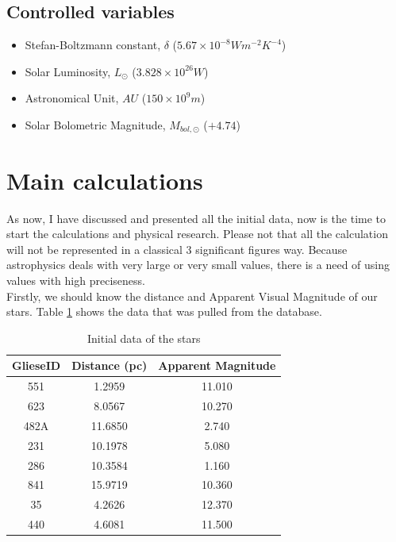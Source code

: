 \documentclass{article}
\begin{document}
  \subsection{Controlled variables}
  
  \begin{itemize}
    
  \item Stefan-Boltzmann constant, $\delta$ ($5.67 \times 10^{-8} W m^{-2} K^{-4}$)
    
  \item Solar Luminosity, $L_{\odot}$ ($3.828 \times 10^{26}W$)
    
  \item Astronomical Unit, $AU$ ($150 \times 10^{9}m$)

  \item Solar Bolometric Magnitude, $M_{bol, \odot}$ ($+4.74$)
    
  \end{itemize}
  
  
  
  
  \section{Main calculations}
  
  As now, I have discussed and presented all the initial data, now is the time to start the calculations and physical research. Please not that all the calculation will not be represented in a classical 3 significant figures way. Because astrophysics deals with very large or very small values, there is a need of using values with high preciseness. \\
  
  Firstly, we should know the distance and Apparent Visual Magnitude of our stars. Table \ref{data} shows the data that was pulled from the database.
  
  \begin{table}[h!]
    \begin{center}
      \caption{Initial data of the stars}
      \begin{tabular}{c | c | c}
        \textbf{GlieseID} & \textbf{Distance (pc)} & \textbf{Apparent Magnitude} \\
        \hline
        551  & 1.2959  & 11.010\\
        623  & 8.0567  & 10.270\\
        482A & 11.6850 & 2.740\\
        231  & 10.1978 & 5.080\\
        286  & 10.3584 & 1.160\\
        841  & 15.9719 & 10.360\\
        35   & 4.2626  & 12.370\\
        440  & 4.6081  & 11.500\\
      \end{tabular}
      \label{data}
    \end{center}
  \end{table}
  
\end{document}
